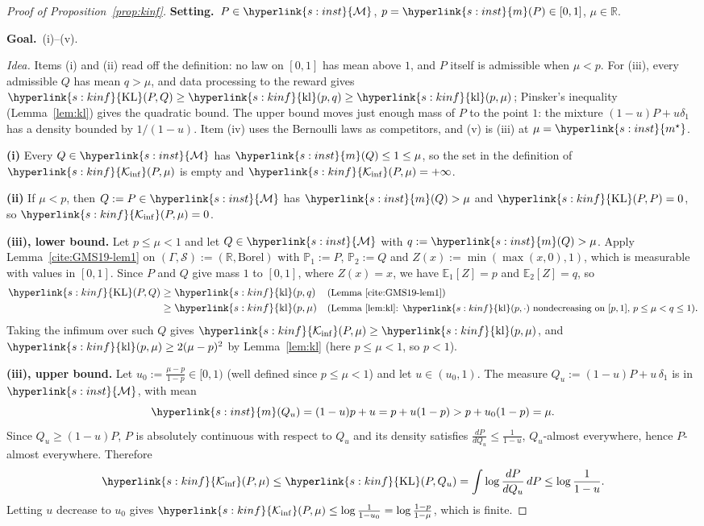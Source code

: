 \documentclass[11pt]{article}
\newcommand{\sy}[2]{{\hyperlink{#1}{#2}}}
\newcommand{\E}{\mathbb{E}}
\newcommand{\1}{\mathbf{1}}
\newcommand{\R}{\mathbb{R}}
\newcommand{\Mu}{\sy{s:inst}{\mathcal M}}
\newcommand{\mean}{\sy{s:inst}{m}}
\newcommand{\ms}{\sy{s:inst}{m^\star}}
\newcommand{\KL}{\sy{s:kinf}{\mathrm{KL}}}
\newcommand{\kl}{\sy{s:kinf}{\mathrm{kl}}}
\newcommand{\Ki}{\sy{s:kinf}{\mathcal K_{\inf}}}
\newcommand{\Setting}{\noindent\textbf{Setting.}\ }
\newcommand{\Goal}{\par\smallskip\noindent\textbf{Goal.}\ }
\newcommand{\why}[1]{\text{\small(#1)}}
\begin{document}
\begin{proof}[Proof of Proposition~\ref{prop:kinf}]
\Setting $P\in\Mu$, $p=\mean(P)\in[0,1]$, $\mu\in\R$. \Goal (i)--(v).

\emph{Idea.} Items (i) and (ii) read off the definition: no law on $[0,1]$ has mean above $1$, and
$P$ itself is admissible when $\mu<p$. For (iii), every admissible $Q$ has mean $q>\mu$, and
data processing to the reward gives $\KL(P,Q)\ge\kl(p,q)\ge\kl(p,\mu)$; Pinsker's inequality
(Lemma~\ref{lem:kl}) gives the quadratic bound. The upper bound moves just enough mass of $P$ to
the point $1$: the mixture $(1-u)P+u\delta_1$ has a density bounded by $1/(1-u)$. Item (iv) uses the
Bernoulli laws as competitors, and (v) is (iii) at $\mu=\ms$.

\textbf{(i)} Every $Q\in\Mu$ has $\mean(Q)\le1\le \mu$, so the set in the definition of $\Ki(P,\mu)$ is
empty and $\Ki(P,\mu)=+\infty$.

\textbf{(ii)} If $\mu<p$, then $Q:=P\in\Mu$ has $\mean(Q)>\mu$ and $\KL(P,P)=0$, so $\Ki(P,\mu)=0$.

\textbf{(iii), lower bound.} Let $p\le \mu<1$ and let $Q\in\Mu$ with $q:=\mean(Q)>\mu$. Apply
Lemma~\ref{cite:GMS19-lem1} on $(\Gamma,\mathcal S):=(\R,\text{Borel})$ with $\mathbb P_1:=P$,
$\mathbb P_2:=Q$ and $Z(x):=\min(\max(x,0),1)$, which is measurable with values in $[0,1]$. Since
$P$ and $Q$ give mass $1$ to $[0,1]$, where $Z(x)=x$, we have $\E_1[Z]=p$ and $\E_2[Z]=q$, so
\begin{align*}
  \KL(P,Q)&\ge\kl(p,q) && \why{Lemma~\ref{cite:GMS19-lem1}}\\
          &\ge\kl(p,\mu) && \why{Lemma~\ref{lem:kl}: $\kl(p,\cdot)$ nondecreasing on $[p,1]$, $p\le \mu<q\le1$}.
\end{align*}
Taking the infimum over such $Q$ gives $\Ki(P,\mu)\ge\kl(p,\mu)$, and $\kl(p,\mu)\ge2(\mu-p)^2$ by
Lemma~\ref{lem:kl} (here $p\le \mu<1$, so $p<1$).

\textbf{(iii), upper bound.} Let $u_0:=\frac{\mu-p}{1-p}\in[0,1)$ (well defined since $p\le \mu<1$) and
let $u\in(u_0,1)$. The measure $Q_u:=(1-u)P+u\,\delta_1$ is in $\Mu$, with mean
\begin{equation*}
  \mean(Q_u)=(1-u)p+u=p+u(1-p)>p+u_0(1-p)=\mu .
\end{equation*}
Since $Q_u\ge(1-u)P$, $P$ is absolutely continuous with respect to $Q_u$ and its density satisfies
$\frac{dP}{dQ_u}\le\frac1{1-u}$, $Q_u$-almost everywhere, hence $P$-almost everywhere. Therefore
\begin{equation*}
  \Ki(P,\mu)\le\KL(P,Q_u)=\int\log\frac{dP}{dQ_u}\,dP\le\log\frac1{1-u}.
\end{equation*}
Letting $u$ decrease to $u_0$ gives $\Ki(P,\mu)\le\log\frac1{1-u_0}=\log\frac{1-p}{1-\mu}$, which is
finite.


\end{proof}
\end{document}
